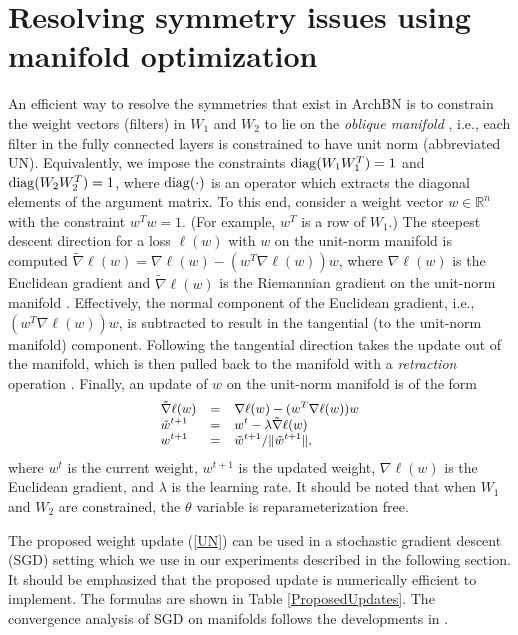 \documentclass{article} %
\newcommand{\changeBM}[1]{#1} %
\newcommand{\changeVB}[1]{#1} %
\newcommand{\diag}{{\rm diag}}
\begin{document}

\section{Resolving symmetry issues using manifold optimization}
\label{Optimization}
An efficient way to \changeBM{resolve} the symmetries that exist in ArchBN is to constrain the weight vectors (filters) in $W_{1}$ and $W_{2}$ to lie on the \emph{oblique manifold} \cite{absil08a, ManOpt}, i.e., each filter in the fully connected layers is constrained to have \changeBM{unit} norm (abbreviated UN). \changeVB{Equivalently, we impose the constraints $\diag (W_1 W_1^T) = 1$ and $\diag (W_2 W_2^T) = 1$, where $\diag(\cdot)$ is an operator which extracts the diagonal elements of the argument matrix.} To this end, consider a weight vector $w \in \mathbb{R}^{n}$ with the constraint $w^Tw = 1$. (For example, $w^T$ is a row of $W_1$.) The steepest descent direction for a loss $\ell(w)$ \changeBM{with $w$ on the unit-norm manifold} is computed $\tilde{\nabla} \ell(w) = \nabla \ell(w) - (w^{T}\nabla \ell(w)) w$, \changeBM{where $\nabla \ell(w)$ is the Euclidean gradient and $\tilde{\nabla} \ell(w)$ is the Riemannian gradient on the unit-norm manifold \cite[Chapter~3]{absil08a}.} Effectively, the normal component of the Euclidean gradient, i.e., $(w^{T}\nabla \ell(w)) w$, is subtracted to result in the tangential (to the unit-norm manifold) component. \changeBM{Following the tangential direction takes the update out of the manifold, which is then pulled back to the manifold with a \emph{retraction} operation \cite[Example~4.1.1]{absil08a}.} \changeBM{Finally}, an update of $w$ on the unit-norm manifold is of the form
\begin{equation}\label{UN}
\small{
\begin{array}{lll}
\tilde{\nabla} \ell(w) &= & \nabla \ell(w) - (w^{T}\nabla \ell(w)) w \\
\tilde{w}^{t+1}& = & w^{t} - \lambda \tilde{\nabla} \ell(w) \\ 
w^{t+1} &= & \tilde{w}^{t+1} / \| \tilde{w}^{t+1} \|, 
\end{array}
}
\end{equation}
where $w^t$ is the current weight, $w^{t+1}$ is the updated weight, $\nabla \ell(w)$ is the Euclidean gradient, and $\lambda$ is the learning rate. \changeBM{It should be noted that when $W_1$ and $W_2$ are constrained, the $\theta$ variable is reparameterization free.}

\changeVB{The proposed weight update (\ref{UN}) can be used in a stochastic gradient descent (SGD) setting which we use in our experiments described in the following section. \changeBM{It should be emphasized that the proposed update is numerically efficient to implement. The formulas are shown in Table \ref{ProposedUpdates}. The convergence analysis of SGD on manifolds follows the developments in \cite{Bottou, bonnabel13a}.}}
\end{document}
